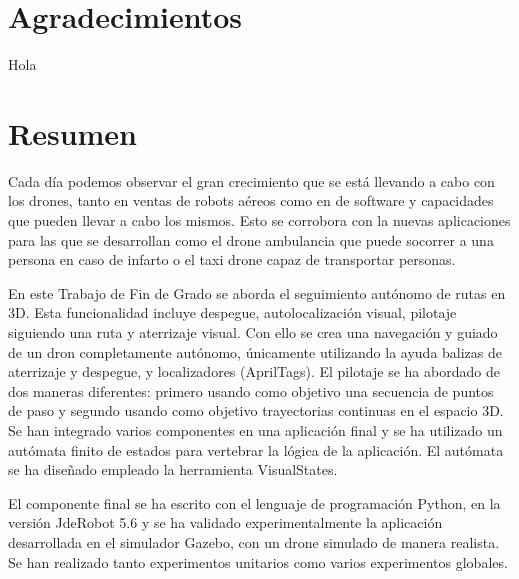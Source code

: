 \documentclass[a4paper, 12pt, oneside]{book}
\begin{document}
\chapter*{Agradecimientos}
\hspace{1cm} Hola

\chapter*{Resumen}
\hspace{1cm} Cada día podemos observar el gran crecimiento que se está llevando a cabo con los drones, tanto en ventas de robots aéreos como en de software y capacidades que pueden llevar a cabo los mismos. Esto se corrobora con la nuevas aplicaciones para las que se desarrollan como el drone ambulancia que puede socorrer a una persona en caso de infarto o el taxi drone capaz de transportar personas.

\hspace{1cm} En este Trabajo de Fin de Grado se aborda el seguimiento autónomo de rutas en 3D. Esta funcionalidad incluye despegue, autolocalización visual, pilotaje siguiendo una ruta y aterrizaje visual. Con ello se crea una navegación y guiado de un dron completamente autónomo, únicamente utilizando la ayuda balizas de aterrizaje y despegue, y localizadores (AprilTags). El pilotaje se ha abordado de dos maneras diferentes: primero usando como objetivo una secuencia de puntos de paso y segundo usando como objetivo trayectorias continuas en el espacio 3D. Se han integrado varios componentes en una aplicación final y se ha utilizado un autómata finito de estados para vertebrar la lógica de la aplicación. El autómata se ha diseñado empleado la herramienta VisualStates.

\hspace{1cm} El componente final se ha escrito con el lenguaje de programación Python, en la versión JdeRobot 5.6 y se ha validado experimentalmente la aplicación desarrollada en el simulador Gazebo, con un drone simulado de manera realista. Se han realizado tanto experimentos unitarios como varios experimentos globales.

\renewcommand{\tablename}{Tabla}
\tableofcontents %

\listoffigures %
\cleardoublepage

\pagestyle{fancy}
\setlength{\parindent}{6mm}
\end{document}

